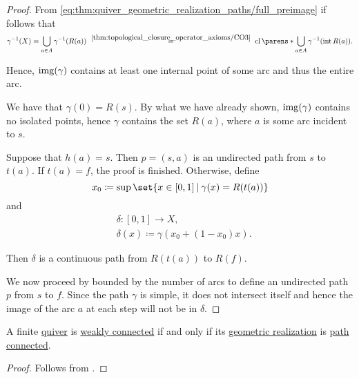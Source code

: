 \begin{proof}
   From \eqref{eq:thm:quiver_geometric_realization_paths/full_preimage} if follows that
  \begin{equation*}
    \gamma^{-1}(X)
    =
    \bigcup_{a \in A} \gamma^{-1}(R(a))
    \reloset{\ref{thm:topological_closure_operator_axioms/CO3}} =
    \cl\parens*{ \bigcup_{a \in A} \gamma^{-1}(\Int R(a)) }.
  \end{equation*}

  Hence, \( \operatorname{img}(\gamma) \) contains at least one internal point of some arc and thus the entire arc.

   We have that \( \gamma(0) = R(s) \). By what we have already shown, \( \operatorname{img}(\gamma) \) contains no isolated points, hence \( \gamma \) contains the set \( R(a) \), where \( a \) is some arc incident to \( s \).

  Suppose that \( h(a) = s \). Then \( p = (s, a) \) is an undirected path from \( s \) to \( t(a) \). If \( t(a) = f \), the proof is finished. Otherwise, define
  \begin{equation*}
    x_0 \coloneqq \sup\set{ x \in [0, 1] \given \gamma(x) = R(t(a)) }
  \end{equation*}
  and
  \begin{equation*}
    \begin{aligned}
      &\delta: [0, 1] \to X, \\
      &\delta(x) \coloneqq \gamma(x_0 + (1 - x_0) x).
    \end{aligned}
  \end{equation*}

  Then \( \delta \) is a continuous path from \( R(t(a)) \) to \( R(f) \).

  We now proceed by  bounded by the number of arcs to define an undirected path \( p \) from \( s \) to \( f \). Since the path \( \gamma \) is simple, it does not intersect itself and hence the image of the arc \( a \) at each step will not be in \( \delta \).
\end{proof}

\begin{corollary}\label{thm:quiver_geometric_realization_connectedness}
  A finite \hyperref[def:quiver]{quiver} is \hyperref[def:quiver_connectedness/weak]{weakly connected} if and only if its \hyperref[def:quiver_geometric_realization/undirected]{geometric realization} is \hyperref[def:path_connected]{path connected}.
\end{corollary}
\begin{proof}
  Follows from .
\end{proof}

